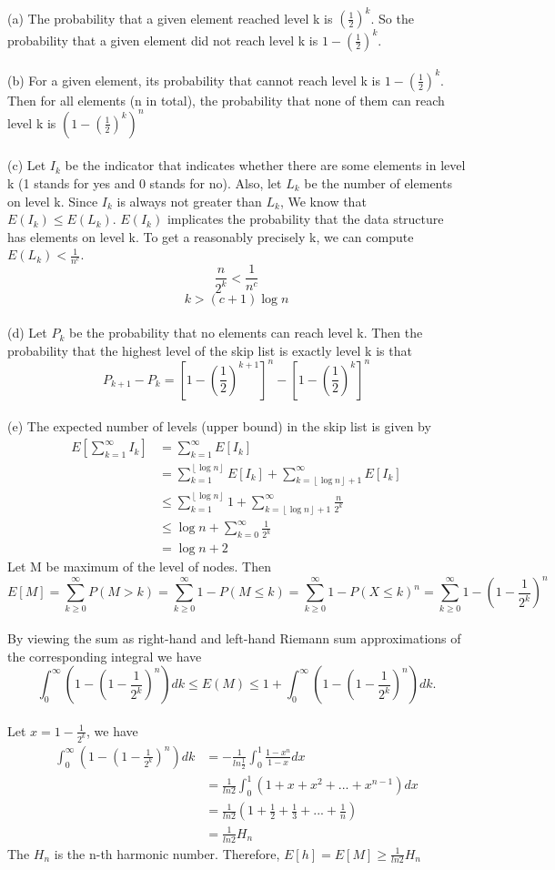 \begin{problem}{3} ~\\
(a) The probability that a given element reached level k is $(\frac{1}{2})^k$. So the probability that a given element did not reach level k is $1-(\frac{1}{2})^k$.\\
\\
(b) For a given element, its probability that cannot reach level k is $1-(\frac{1}{2})^k$. Then for all elements (n in total), the probability that none of them can reach level k is $(1-(\frac{1}{2})^k)^n$\\
\\
(c) Let $I_k$ be the indicator that indicates whether there are some elements in level k (1 stands for yes and 0 stands for no). Also, let $L_k$ be the number of elements on level k. Since $I_k$ is always not greater than $L_k$, We know that $E(I_k) \leq E(L_k)$. $E(I_k)$ implicates the probability that the data structure has elements on level k. To get a reasonably precisely k, we can compute $E(L_k) < \frac{1}{n^c}$.
$$\frac{n}{2^k} < \frac{1}{n^c}$$
$$k > (c+1)\log{n}$$\\
(d) Let $P_k$ be the probability that no elements can reach level k. Then the probability that the highest level of the skip list is exactly level k is that
$$P_{k+1} - P_k = [1-(\frac{1}{2})^{k+1}]^n - [1-(\frac{1}{2})^{k}]^n$$\\
(e) The expected number of levels (upper bound) in the skip list is given by
\begin{align*}
E[\sum_{k=1}^{\infty} I_k] &= \sum_{k=1}^{\infty} E[I_k]\\
 &= \sum_{k=1}^{\left\lfloor \log{n} \right\rfloor} E[I_k] + \sum_{k=\left\lfloor \log{n} \right\rfloor + 1}^{\infty} E[I_k] \\
 &\leq \sum_{k=1}^{\left\lfloor \log{n} \right\rfloor} 1 + \sum_{k=\left\lfloor \log{n} \right\rfloor + 1}^{\infty} \frac{n}{2^k}\\
 &\leq \log{n} + \sum_{k=0}^{\infty} \frac{1}{2^k}\\
 &= \log{n} + 2
\end{align*}
Let M be maximum of the level of nodes. Then $$E[M] = \sum_{k\geq 0}^{\infty}P(M>k) = \sum_{k\geq 0}^{\infty}1-P(M\leq k) = \sum_{k\geq 0}^{\infty}1-P(X\leq k)^{n} = \sum_{k\geq 0}^{\infty}1-(1-\frac{1}{2^k})^n$$\\
By viewing the sum as right-hand and left-hand Riemann sum approximations of the corresponding integral we have
$$\int_0^{\infty} (1 - (1 - \frac{1}{2^k})^n) dk \leq E(M) \leq 1 + \int_0^{\infty} (1 - (1 - \frac{1}{2^k})^n) dk.$$\\
Let $x = 1 - \frac{1}{2^k}$, we have 
\begin{align*}
\int_0^{\infty} (1 - (1 - \frac{1}{2^k})^n) dk &= -\frac{1}{ln\frac{1}{2}}\int_0^1 \frac{1 - x^n}{1 - x} dx\\
&=\frac{1}{ln2}\int_0^1 (1+x+x^2+...+x^{n-1}) dx \\
&=\frac{1}{ln2}(1+\frac{1}{2}+\frac{1}{3}+...+\frac{1}{n})\\
&=\frac{1}{ln2}H_n
\end{align*}
The $H_n$ is the n-th harmonic number. Therefore, $E[h]=E[M]\geq\frac{1}{ln2}H_n$
\end{problem}